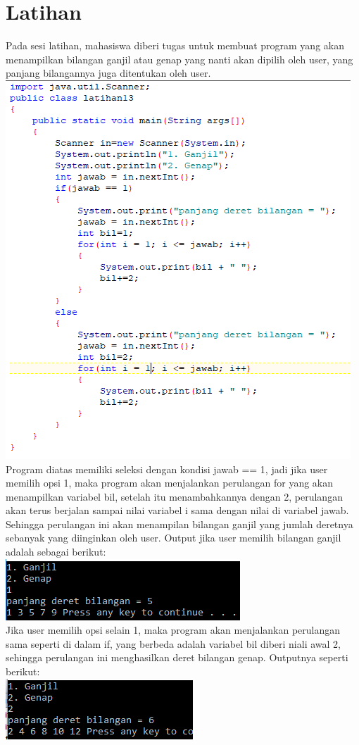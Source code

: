 \documentclass[a4paper,12pt]{article}
\begin{document}
\newpage

\section{Latihan}
Pada sesi latihan, mahasiswa diberi tugas untuk membuat program yang akan menampilkan bilangan ganjil atau genap yang nanti akan dipilih oleh user, yang panjang bilangannya juga ditentukan oleh user.\\
\includegraphics{img10.PNG}\\
Program diatas memiliki seleksi dengan kondisi jawab == 1, jadi jika user memilih opsi 1, maka program akan menjalankan perulangan for yang akan menampilkan variabel bil, setelah itu menambahkannya dengan 2, perulangan akan terus berjalan sampai nilai variabel i sama dengan nilai di variabel jawab. Sehingga perulangan ini akan menampilan bilangan ganjil yang jumlah deretnya sebanyak yang diinginkan oleh user. Output jika user memilih bilangan ganjil adalah sebagai berikut:\\
\includegraphics{img11.PNG}\\
Jika user memilih opsi selain 1, maka program akan menjalankan perulangan sama seperti di dalam if, yang berbeda adalah variabel bil diberi niali awal 2, sehingga perulangan ini menghasilkan deret bilangan genap. Outputnya seperti berikut:\\
\includegraphics{img12.PNG}
\end{document}
